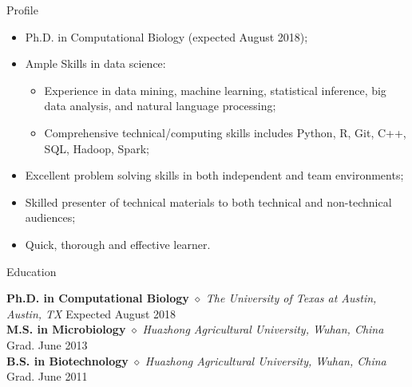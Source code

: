 \documentclass{my_resume} %
\begin{document}

\begin{rSection}{Profile}
\renewcommand\labelitemi{$\cdot$}
\begin{itemize}
  \item Ph.D. in Computational Biology (expected August 2018);
  \vspace{-1.7em}\\
  \item Ample Skills in data science:
  \vspace{-1.7em}\\
    \begin{itemize}
      \item Experience in data mining, machine learning, statistical inference,
        big data analysis, and natural language processing;
      \vspace{-1.7em}\\
      \item Comprehensive technical/computing skills includes Python, R, Git,
        C++, SQL, Hadoop, Spark;
      \vspace{-1.7em}\\
    \end{itemize}
  \item Excellent problem solving skills in both independent and team
    environments;
  \vspace{-1.7em}\\
  \item Skilled presenter of technical materials to both technical and
    non-technical audiences;
  \vspace{-1.7em}\\
  \item Quick, thorough and effective learner.
\end{itemize}
\end{rSection}


\begin{rSection}{Education}

{\bf Ph.D. in Computational Biology} {$\diamond$} {\em The University of
Texas at Austin, Austin, TX} \hfill {Expected August 2018} \\
{\bf M.S. in Microbiology} {$\diamond$} {\em Huazhong Agricultural University,
Wuhan, China} \hfill {Grad. June 2013} \\
{\bf B.S. in Biotechnology} {$\diamond$} {\em Huazhong Agricultural University,
Wuhan, China} \hfill {Grad. June 2011}
\end{rSection}
\end{document}
